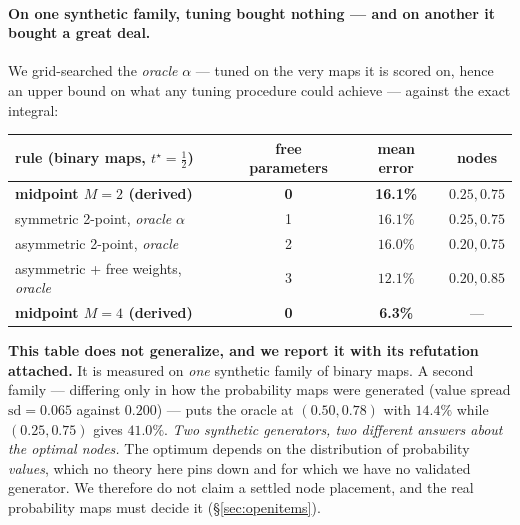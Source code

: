 \documentclass[11pt]{article}
\theoremstyle{remark}
\begin{document}
\paragraph{On one synthetic family, tuning bought nothing --- and on another it bought
a great deal.} We grid-searched the \emph{oracle} $\alpha$ --- tuned on the very maps
it is scored on, hence an upper bound on what any tuning procedure could achieve ---
against the exact integral:

\begin{center}
\small
\begin{tabular}{lccc}
\toprule
rule (\textbf{binary maps}, $t^\star = \tfrac12$) & free parameters & mean error & nodes \\
\midrule
\textbf{midpoint $M{=}2$ (derived)} & \textbf{0} & \textbf{16.1\%} & $0.25, 0.75$ \\
symmetric 2-point, \emph{oracle} $\alpha$ & 1 & $16.1\%$ & $0.25, 0.75$ \\
asymmetric 2-point, \emph{oracle} & 2 & $16.0\%$ & $0.20, 0.75$ \\
asymmetric + free weights, \emph{oracle} & 3 & $12.1\%$ & $0.20, 0.85$ \\
\midrule
\textbf{midpoint $M{=}4$ (derived)} & \textbf{0} & \textbf{6.3\%} & --- \\
\bottomrule
\end{tabular}
\end{center}

\textbf{This table does not generalize, and we report it with its refutation
attached.} It is measured on \emph{one} synthetic family of binary maps. A second
family --- differing only in how the probability maps were generated (value spread
$\mathrm{sd}=0.065$ against $0.200$) --- puts the oracle at $(0.50, 0.78)$ with $14.4\%$
while $(0.25,0.75)$ gives $41.0\%$. \emph{Two synthetic generators, two different
answers about the optimal nodes.} The optimum depends on the distribution of
probability \emph{values}, which no theory here pins down and for which we have no
validated generator. We therefore do not claim a settled node placement, and the real
probability maps must decide it (\S\ref{sec:openitems}).
\end{document}
